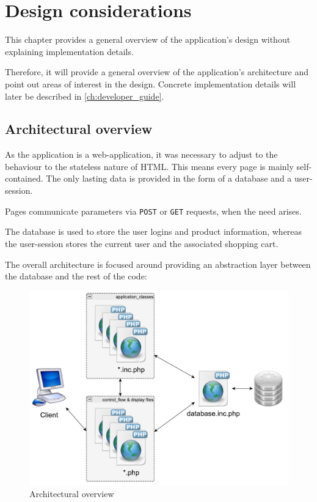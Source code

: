 \chapter{Design considerations}\label{ch:design} %

This chapter provides a general overview of the application's design without explaining implementation details.

Therefore, it will provide a general overview of the application's architecture and point out areas of interest in the design. Concrete implementation details will later be described in \autoref{ch:developer_guide}.

\section{Architectural overview}
\label{sec:architectural_overview}

As the application is a web-application, it was necessary to adjust to the behaviour to the stateless nature of \ac{HTML}. This means every page is mainly self-contained. The only lasting data is provided in the form of a database and a user-session.

Pages communicate parameters via \texttt{POST} or \texttt{GET} requests, when the need arises.

The database is used to store the user logins and product information, whereas the user-session stores the current user and the associated shopping cart.

The overall architecture is focused around providing an abstraction layer between the database and the rest of the code:

\begin{figure}[H]
\begin{center}
\includegraphics[width=\textwidth]{gfx/overview.pdf}
\caption{Architectural overview}
\label{fig:overview}
\end{center}
\end{figure}

